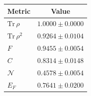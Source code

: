 \begin{tabular}{lc}
\hline
Metric & Value \\
\hline
$\mathrm{Tr}\,\rho$ & $1.0000\pm0.0000$ \\
$\mathrm{Tr}\,\rho^2$ & $0.9264\pm0.0104$ \\
$F$ & $0.9455\pm0.0054$ \\
$C$ & $0.8314\pm0.0148$ \\
$\mathcal{N}$ & $0.4578\pm0.0054$ \\
$E_F$ & $0.7641\pm0.0200$ \\
\hline
\end{tabular}